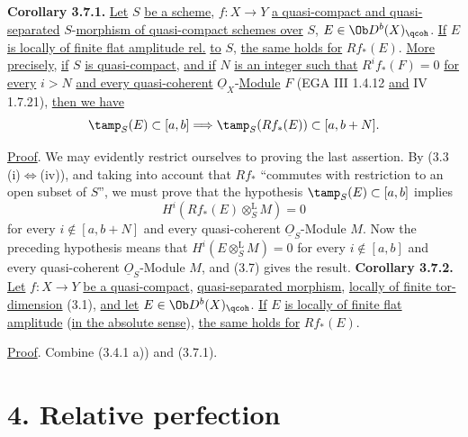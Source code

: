 \textbf{Corollary 3.7.1.} \uline{Let} \(S\) \uline{be a scheme}, \(f:X\to Y\) \uline{a quasi-compact and quasi-separated} \(S\)-\uline{morphism of quasi-compact schemes over} \(S\), \(E\in\Ob D^b(X)_{\qcoh}\). \uline{If} \(E\) \uline{is locally of finite flat amplitude rel.} \uline{to} \(S\), \uline{the same holds for} \(Rf_*(E)\). \uline{More precisely}, \uline{if} \(S\) \uline{is quasi-compact}, \uline{and if} \(N\) \uline{is an integer such that} \(R^if_*(F)=0\) \uline{for every} \(i>N\) \uline{and every quasi-coherent} \(\underline{O}_X\)-\uline{Module} \(F\) (EGA III 1.4.12 \uline{and} IV 1.7.21), \uline{then we have}
\[
 \tamp_S(E)\subset[a,b]
 \Longrightarrow
 \tamp_S(Rf_*(E))
 \subset[a,b+N].
\]

\uline{Proof}. We may evidently restrict ourselves to proving the last assertion. By (3.3 (i)\(\Longleftrightarrow\)(iv)), and taking into account that \(Rf_*\) ``commutes with restriction to an open subset of \(S\)'', we must prove that the hypothesis \(\tamp_S(E)\subset[a,b]\) implies
\[
 H^i(Rf_*(E)\otimes_S^{\mathrm L}M)=0
\]
for every \(i\notin[a,b+N]\) and every quasi-coherent \(\underline{O}_S\)-Module \(M\). Now the preceding hypothesis means that \(H^i(E\otimes_S^{\mathrm L}M)=0\) for every \(i\notin[a,b]\) and every quasi-coherent \(\underline{O}_S\)-Module \(M\), and (3.7) gives the result.
%
\textbf{Corollary 3.7.2.} \uline{Let} \(f:X\to Y\) \uline{be a quasi-compact}, \uline{quasi-separated morphism}, \uline{locally of finite tor-dimension} (3.1), \uline{and let} \(E\in\Ob D^b(X)_{\qcoh}\). \uline{If} \(E\) \uline{is locally of finite flat amplitude} (\uline{in the absolute sense}), \uline{the same holds for} \(Rf_*(E)\).

\uline{Proof}. Combine (3.4.1 a)) and (3.7.1).

\section*{4. Relative perfection}

